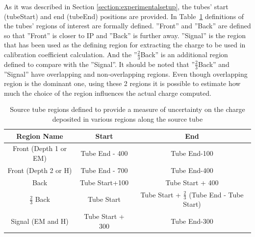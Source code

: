 As it was described in Section \ref{section:experimentalsetup}, the tubes' start (tubeStart) and end (tubeEnd) positions are provided. In Table~\ref{tab:TubeRegions} definitions of the tubes' regions of interest are formally defined. ''Front'' and ''Back'' are defined so that ''Front'' is closer to IP and ''Back'' is further away. ''Signal'' is the region that has been used as the defining region for extracting
the charge to be used in calibration coefficient calculation. And the ''$\frac{2}{3}$Back''
is an additional region defined to compare with the ''Signal''. It should be
noted that ''$\frac{2}{3}$Back'' and ''Signal'' have overlapping and non-overlapping
regions. Even though overlapping region is the dominant one, using these 2 regions it is possible to estimate how much the choice of the region influences the actual charge computed.
\begin{table}[!h]
    \centering
    \caption{Source tube regions defined to provide a measure of uncertainty on
    the charge deposited in various regions along the source tube}
    \begin{tabular}{|c|c|c|}
    \hline
    Region Name & Start & End \\
    \hline
    Front (Depth 1 or EM) & Tube End - 400 & Tube End-100 \\
    Front (Depth 2 or H) & Tube End - 700 & Tube End-400 \\
    Back & Tube Start+100 & Tube Start + 400 \\
    $\frac{2}{3}$ Back & Tube Start & Tube Start + $\frac{2}{3}$ (Tube End - Tube Start) \\
    Signal (EM and H) & Tube Start + 300 & Tube End-300 \\
    \hline
    \end{tabular}
    \label{tab:TubeRegions}
\end{table}

